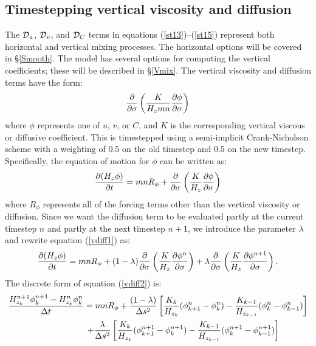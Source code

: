 \subsection{Timestepping vertical viscosity and diffusion}
\label{Vfric}
The ${\cal D}_u$, ${\cal D}_v$, and ${\cal D}_C$ terms in
equations (\ref{st13})--(\ref{st15}) represent both horizontal and
vertical mixing processes.  The horizontal options will be covered in
\S\ref{Smooth}. The model has several options for computing the
vertical coefficients; these will be described in \S\ref{Vmix}.
The vertical viscosity and diffusion terms have
the form:
\begin{equation}
   {\partial \over \partial \sigma} \left( {K \over H_z mn} {\partial
   \phi \over \partial \sigma} \right)
\end{equation}
where $\phi$ represents one of $u$, $v$, or $C$, and $K$ is the
corresponding vertical viscous or diffusive coefficient. This is
timestepped using a semi-implicit Crank-Nicholson scheme with a
weighting of 0.5 on the old timestep and 0.5 on the new timestep.
Specifically, the equation of motion for $\phi$
can be written as:
\begin{equation}
  {\partial (H_z \phi) \over \partial t} = mnR_{\phi} +
  {\partial \over \partial \sigma} \left( {K \over H_z}
  {\partial \phi \over \partial \sigma} \right)
\label{vdiff1}
\end{equation}
where $R_{\phi}$ represents all of the forcing terms other than the
vertical viscosity or diffusion.  Since we want the diffusion term
to be evaluated partly at the current timestep $n$ and partly at the
next timestep $n+1$, we introduce the parameter $\lambda$ and rewrite
equation (\ref{vdiff1}) as:
\begin{equation}
  {\partial (H_z \phi) \over \partial t} = mnR_{\phi} +
  (1-\lambda) {\partial \over \partial \sigma} \left( {K \over H_z}
  {\partial \phi^n \over \partial \sigma} \right) +
  \lambda {\partial \over \partial \sigma} \left( {K \over H_z}
  {\partial \phi^{n+1} \over \partial \sigma} \right) .
\label{vdiff2}
\end{equation}
The discrete form of equation (\ref{vdiff2}) is:
\begin{multline}
   {H_{z_k}^{n+1} \phi_k^{n+1} - H_{z_k}^n \phi_k^n \over \Delta t} =
   mn R_{\phi} + {(1-\lambda) \over \Delta s^2} \left[
   {K_k \over H_{z_k}} (\phi_{k+1}^n - \phi_k^n) -
   {K_{k-1} \over H_{z_{k-1}}} (\phi_k^n - \phi_{k-1}^n) \right]
\\ \vspace{1mm}
 \qquad \qquad \qquad  + {\lambda \over \Delta s^2} \left[
   {K_k \over H_{z_k}} (\phi_{k+1}^{n+1} - \phi_k^{n+1}) -
   {K_{k-1} \over H_{z_{k-1}}} (\phi_k^{n+1} - \phi_{k-1}^{n+1})
   \right]
\label{vdiff3}
\end{multline}

